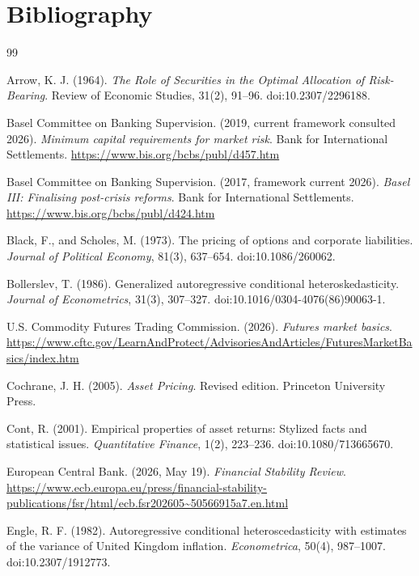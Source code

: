 \documentclass[11pt,oneside,openany]{book}
\begin{document}
\backmatter

\chapter*{Bibliography}
\begin{thebibliography}{99}

Arrow, K. J. (1964). \textit{The Role of Securities in the Optimal Allocation of Risk-Bearing}. Review of Economic Studies, 31(2), 91--96. doi:10.2307/2296188.

Basel Committee on Banking Supervision. (2019, current framework consulted 2026). \textit{Minimum capital requirements for market risk}. Bank for International Settlements. \url{https://www.bis.org/bcbs/publ/d457.htm}

Basel Committee on Banking Supervision. (2017, framework current 2026). \textit{Basel III: Finalising post-crisis reforms}. Bank for International Settlements. \url{https://www.bis.org/bcbs/publ/d424.htm}

Black, F., and Scholes, M. (1973). The pricing of options and corporate liabilities. \textit{Journal of Political Economy}, 81(3), 637--654. doi:10.1086/260062.

Bollerslev, T. (1986). Generalized autoregressive conditional heteroskedasticity. \textit{Journal of Econometrics}, 31(3), 307--327. doi:10.1016/0304-4076(86)90063-1.

U.S. Commodity Futures Trading Commission. (2026). \textit{Futures market basics}. \url{https://www.cftc.gov/LearnAndProtect/AdvisoriesAndArticles/FuturesMarketBasics/index.htm}

Cochrane, J. H. (2005). \textit{Asset Pricing}. Revised edition. Princeton University Press.

Cont, R. (2001). Empirical properties of asset returns: Stylized facts and statistical issues. \textit{Quantitative Finance}, 1(2), 223--236. doi:10.1080/713665670.

European Central Bank. (2026, May 19). \textit{Financial Stability Review}. \url{https://www.ecb.europa.eu/press/financial-stability-publications/fsr/html/ecb.fsr202605~50566915a7.en.html}

Engle, R. F. (1982). Autoregressive conditional heteroscedasticity with estimates of the variance of United Kingdom inflation. \textit{Econometrica}, 50(4), 987--1007. doi:10.2307/1912773.


\end{thebibliography}
\end{document}
